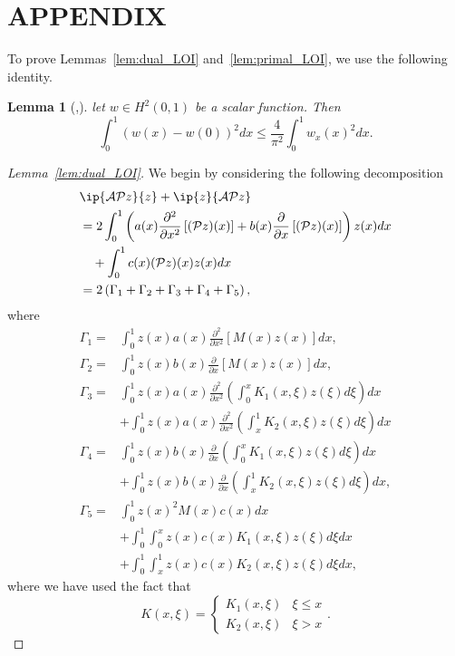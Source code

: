 \documentclass[US letter, 9 pt, conference]{ieeeconf}  \usepackage{setspace}
\newtheorem{lemma}{Lemma}
\newcommand{\pfx}{\frac{\partial}{\partial x}}
\newcommand{\igzo}{\int_0^1}
\newcommand{\igzx}{\int_0^x}
\newcommand{\igxo}{\int_x^1}
\newcommand{\pop}{\mathcal{P}}
\begin{document}
\section*{APPENDIX}

To prove Lemmas~\ref{lem:dual_LOI} and~\ref{lem:primal_LOI}, we use the following identity.
\begin{lemma}[\cite{hardy1952inequalities},\cite{krstic2008boundary}]
\label{lem:wirtinger}
 let $w \in H^2(0,1)$ be a scalar function. Then
  \[\int_0^1 (w(x)-w(0))^2dx \leq \frac{4}{\pi^2} \int_0^1 w_x(x)^2 dx.\]
\end{lemma}

\begin{proof}[Lemma~\ref{lem:dual_LOI}]
We begin by considering the following decomposition
\begin{align}
&\ip{\mathcal{A}\pop z}{z}+\ip{z}{\mathcal{A}\pop z}  \nonumber \\
&= 2 \igzo \left(a(x)\frac{\partial^2}{\partial x^2}\left[(\pop z)(x) \right]+b(x)\pfx \left[(\pop z)(x) \right]\right)z(x)dx \nonumber \\
& \quad +\igzo  c(x)(\pop z)(x)  z(x) dx \nonumber \\
&\label{eqn:dual_gamma}= 2 \left(\Gamma_1+\Gamma_2+\Gamma_3+\Gamma_4+\Gamma_5  \right),
\end{align} where
\begin{align*}
\Gamma_1 =& \igzo z(x)a(x) \frac{\partial^2}{\partial x^2} \left[M(x)z(x) \right]dx,\\
\Gamma_2 =& \igzo z(x)b(x) \pfx \left[M(x)z(x) \right]dx,\\
\Gamma_3 =& \igzo z(x)a(x)\frac{\partial^2}{\partial x^2} \left(\igzx K_1(x,\xi)z(\xi)d\xi\right)dx \\
&+\igzo z(x)a(x)\frac{\partial^2}{\partial x^2} \left(\igxo K_2(x,\xi)z(\xi)d\xi\right)dx \\
\Gamma_4 =&\igzo z(x)b(x) \pfx \left(\igzx K_1(x,\xi)z(\xi)d\xi\right)dx\\
&+\igzo z(x)b(x) \pfx \left(\igxo K_2(x,\xi)z(\xi)d\xi\right)dx,\\
\Gamma_5 = &\igzo z(x)^2 M(x)c(x)dx\\
&+ \igzo \igzx z(x)c(x)K_1(x,\xi)z(\xi)d\xi dx \\
&+ \igzo \igxo z(x)c(x)K_2(x,\xi)z(\xi)d\xi dx,
\end{align*} where we have used the fact that
\[
K(x,\xi) = \begin{cases} K_1(x,\xi) & \xi \leq x \\
K_2(x,\xi) &  \xi>x \end{cases}.
\]


\end{proof}
\end{document}
